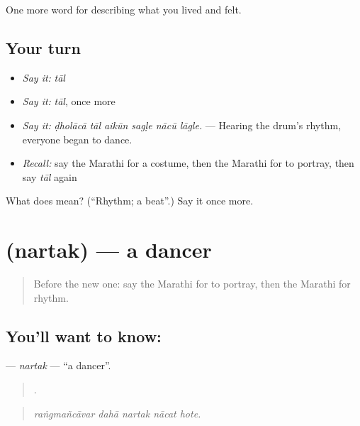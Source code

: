 \begin{grammarlens}[title={What you've built}]
One more word for describing what you lived and felt.
\end{grammarlens}

\subsection*{Your turn}
\begin{itemize}
\raggedright
  \item \emph{Say it:} \emph{tāl}
  \item \emph{Say it:} \emph{tāl}, once more
  \item \emph{Say it:} \emph{ḍholācā tāl aikūn sagḷe nācū lāgle.} — Hearing the drum's rhythm, everyone began to dance.
  \item \emph{Recall:} say the Marathi for a costume, then the Marathi for to portray, then say \emph{tāl} again
\end{itemize}

\begin{tcolorbox}[breakable,colback=teal!4,colframe=teal!35!black,title={Before you move on}]
What does  mean? (\textquotedblleft{}Rhythm; a beat\textquotedblright{}.) Say it once more.
\end{tcolorbox}
\section[\texorpdfstring{\mr{नर्तक} (nartak)}{नर्तक (nartak)}]{ (nartak) — a dancer}

\label{lesson:MR-C538-nartak}



\begin{quote}
Before the new one: say the Marathi for to portray, then the Marathi for rhythm.
\end{quote}

\subsection*{You'll want to know: }
\textbf{} — \emph{nartak} — \textquotedblleft{}a dancer\textquotedblright{}.

\begin{quote}
    .
\end{quote}

\begin{quote}
\emph{raṅgmañcāvar dahā nartak nācat hote.}
\end{quote}

